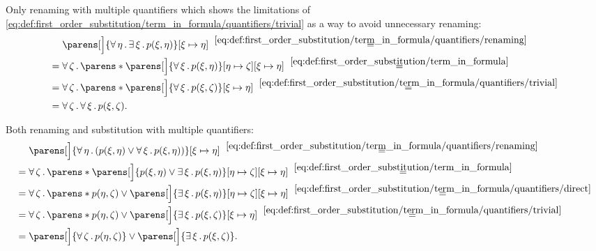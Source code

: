 \begin{example}
\begin{thmenum}
     Only renaming with multiple quantifiers which shows the limitations of \eqref{eq:def:first_order_substitution/term_in_formula/quantifiers/trivial} as a way to avoid unnecessary renaming:
    \begin{align*}
      &\phantom{{}={}}
      \parens[\Big]{\qforall \eta \qexists \xi p(\xi, \eta)}[\xi \mapsto \eta]
      \reloset {\eqref{eq:def:first_order_substitution/term_in_formula/quantifiers/renaming}} = \\ &=
      \qforall \zeta \parens*{ \parens[\Big]{ \qforall \xi p(\xi, \eta) }[\eta \mapsto \zeta][\xi \mapsto \eta]}
      \reloset {\eqref{eq:def:first_order_substitution/term_in_formula}} = \\ &=
      \qforall \zeta \parens*{ \parens[\Big]{ \qforall \xi p(\xi, \zeta) }[\xi \mapsto \eta]}
      \reloset {\eqref{eq:def:first_order_substitution/term_in_formula/quantifiers/trivial}} = \\ &=
      \qforall \zeta \qforall \xi p(\xi, \zeta).
    \end{align*}

     Both renaming and substitution with multiple quantifiers:
    \begin{align*}
      &\phantom{{}={}}
      \parens[\Big]{ \qforall \eta (p(\xi, \eta) \vee \qforall \xi p(\xi, \eta)) }[\xi \mapsto \eta]
      \reloset {\eqref{eq:def:first_order_substitution/term_in_formula/quantifiers/renaming}} = \\ &=
      \qforall \zeta \parens*{ \parens[\Big]{ p(\xi, \eta) \vee \qexists \xi p(\xi, \eta) }[\eta \mapsto \zeta][\xi \mapsto \eta] }
      \reloset {\eqref{eq:def:first_order_substitution/term_in_formula}} = \\ &=
      \qforall \zeta \parens*{ p(\eta, \zeta) \vee \parens[\Big]{ \qexists \xi p(\xi, \eta) }[\eta \mapsto \zeta][\xi \mapsto \eta] }
      \reloset {\eqref{eq:def:first_order_substitution/term_in_formula/quantifiers/direct}} = \\ &=
      \qforall \zeta \parens*{ p(\eta, \zeta) \vee \parens[\Big]{ \qexists \xi p(\xi, \zeta) }[\xi \mapsto \eta] }
      \reloset {\eqref{eq:def:first_order_substitution/term_in_formula/quantifiers/trivial}} = \\ &=
      \parens[\Big]{ \qforall \zeta p(\eta, \zeta) } \vee \parens[\Big]{ \qexists \xi p(\xi, \zeta) }.
    \end{align*}


\end{thmenum}
\end{example}
